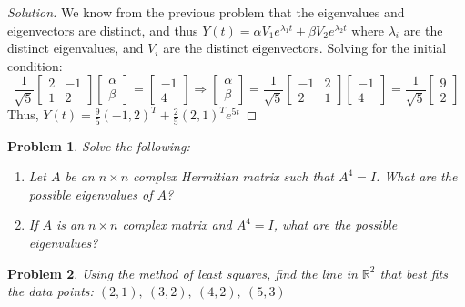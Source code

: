 \documentclass[oneside]{book}
\theoremstyle{mystyle}
\newtheorem{problem}{Problem}[section]
\begin{document}
\begin{proof}[Solution]
We know from the previous problem that the eigenvalues and eigenvectors are distinct, and thus $Y(t) = \alpha V_1 e^{\lambda_1 t} + \beta V_2 e^{\lambda_2 t}$ where $\lambda_{i}$ are the distinct eigenvalues, and $V_{i}$ are the distinct eigenvectors. Solving for the initial condition:
\begin{equation*}
    \frac{1}{\sqrt{5}}\begin{bmatrix} 2 & -1 \\ 1 & 2 \end{bmatrix}\begin{bmatrix} \alpha \\ \beta \end{bmatrix}=\begin{bmatrix} -1 \\ 4 \end{bmatrix}\Rightarrow \begin{bmatrix} \alpha \\ \beta \end{bmatrix}=\frac{1}{\sqrt{5}}\begin{bmatrix} -1 & 2 \\ 2 & 1 \end{bmatrix}\begin{bmatrix} -1 \\ 4 \end{bmatrix}=\frac{1}{\sqrt{5}} \begin{bmatrix} 9 \\ 2 \end{bmatrix}
\end{equation*}
Thus, $Y(t) = \frac{9}{5}(-1,2)^T + \frac{2}{5} (2,1)^T e^{5t}$ 
\end{proof}
\begin{problem}
Solve the following:
\begin{enumerate}
    \item Let $A$ be an $n\times n$ complex Hermitian matrix such that $A^4=I$. What are the possible eigenvalues of $A$?
    \item If $A$ is an $n\times n$ complex matrix and $A^4 = I$, what are the possible eigenvalues?
\end{enumerate}
\end{problem}
\begin{problem}
Using the method of least squares, find the line in $\mathbb{R}^2$ that best fits the data points: $(2,1),\ (3,2),\ (4,2),\ (5,3)$
\end{problem}
\end{document}
